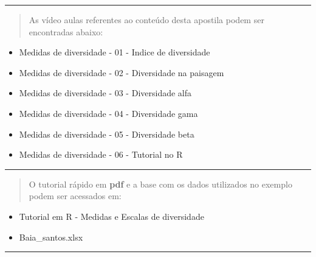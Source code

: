 \documentclass[
]{book}
\begin{document}
\begin{center}\rule{0.5\linewidth}{0.5pt}\end{center}

\begin{quote}
As vídeo aulas referentes ao conteúdo desta apostila podem ser encontradas abaixo:
\end{quote}

\begin{itemize}
\item
  Medidas de diversidade - 01 - Indice de diversidade
\item
  Medidas de diversidade - 02 - Diversidade na paisagem
\item
  Medidas de diversidade - 03 - Diversidade alfa
\item
  Medidas de diversidade - 04 - Diversidade gama
\item
  Medidas de diversidade - 05 - Diversidade beta
\item
  Medidas de diversidade - 06 - Tutorial no R
\end{itemize}

\begin{center}\rule{0.5\linewidth}{0.5pt}\end{center}

\begin{quote}
O tutorial rápido em \textbf{pdf} e a base com os dados utilizados no exemplo podem ser acessados em:
\end{quote}

\begin{itemize}
\item
  Tutorial em R - Medidas e Escalas de diversidade
\item
  Baia\_santos.xlsx
\end{itemize}

\begin{center}\rule{0.5\linewidth}{0.5pt}\end{center}

  
\end{document}
